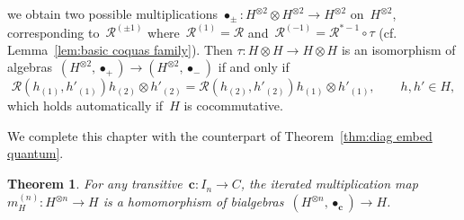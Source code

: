 \documentclass[12pt, reqno]{amsart}
\newtheorem{theorem}{Theorem}[section]
\theoremstyle{definition}
\numberwithin{equation}{section}
\newcommand{\tensor}{\otimes}
\begin{document}
we obtain two possible multiplications
$\bullet_\pm:H^{\tensor 2}\tensor H^{\tensor 2}\to H^{\tensor 2}$ on~$H^{\tensor 2}$,
corresponding to~$\mathcal R^{(\pm 1)}$ 
where~$\mathcal R^{(1)}=\mathcal R$
and~$\mathcal R^{(-1)}=\mathcal R^{\ast-1}\circ\tau$
(cf. Lemma~\ref{lem:basic coquas family}).
Then $\tau:H\tensor H\to H\tensor H$
is an isomorphism of algebras~$(H^{\tensor 2},
\bullet_+)\to (H^{\tensor 2},\bullet_-)$ if and only if
\begin{equation}\label{eq:n=2 isom cond}
\mathcal R(h_{(1)},h'_{(1)})h_{(2)}\tensor h'_{(2)}=
\mathcal R(h_{(2)},h'_{(2)})h_{(1)}\tensor h'_{(1)},\qquad h,h'\in H,
\end{equation}
which holds automatically if~$H$ is cocommutative.

We complete this chapter with the counterpart of Theorem~\ref{thm:diag embed quantum}.
\begin{theorem}\label{thm:mult is homomorphism}
For any transitive~$\mathbf c:I_n\to C$, the iterated multiplication map~$m_H^{(n)}:
H^{\tensor n}\to H$
is a homomorphism of bialgebras~$(H^{\tensor n},
\bullet_{\mathbf c})\to H$.
\end{theorem}
\end{document}

